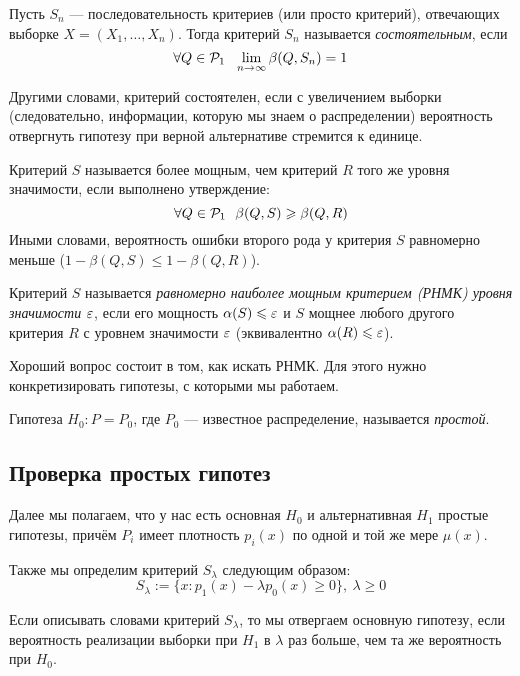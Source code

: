 \begin{definition}
	Пусть $S_n$ --- последовательность критериев (или просто критерий), отвечающих выборке $X = (X_1, \ldots, X_n)$. Тогда критерий $S_n$ называется \textit{состоятельным}, если
	\[
		\forall Q \in \mathcal{P}_1\ \ \lim_{n \to \infty} \beta(Q, S_n) = 1
	\]
\end{definition}

\begin{anote}
	Другими словами, критерий состоятелен, если с увеличением выборки (следовательно, информации, которую мы знаем о распределении) вероятность отвергнуть гипотезу при верной альтернативе стремится к единице.
\end{anote}

\begin{definition}
	Критерий $S$ называется более мощным, чем критерий $R$ того же уровня значимости, если выполнено утверждение:
	\[
		\forall Q \in \mathcal{P}_1\ \ \beta(Q, S) \geqslant \beta(Q, R)
	\]
	Иными словами, вероятность ошибки второго рода у критерия $S$ равномерно меньше ($1 - \beta(Q, S) \le 1 - \beta(Q, R)$).
\end{definition}

\begin{definition}
	Критерий $S$ называется \textit{равномерно наиболее мощным критерием (РНМК) уровня значимости $\varepsilon$}, если его мощность $\alpha(S) \leqslant \varepsilon$ и $S$ мощнее любого другого критерия $R$ с уровнем значимости $\varepsilon$ (эквивалентно $\alpha(R) \leqslant \varepsilon$).
\end{definition}

\begin{note}
	Хороший вопрос состоит в том, как искать РНМК. Для этого нужно конкретизировать гипотезы, с которыми мы работаем.
\end{note}

\begin{definition}
	Гипотеза $H_0 \colon P = P_0$, где $P_0$ --- известное распределение, называется \textit{простой}.
\end{definition}

\subsection{Проверка простых гипотез}

\begin{note}
	Далее мы полагаем, что у нас есть основная $H_0$ и альтернативная $H_1$ простые гипотезы, причём $P_i$ имеет плотность $p_i(x)$ по одной и той же мере $\mu(x)$.
	
	Также мы определим критерий $S_\lambda$ следующим образом:
	\[
		S_\lambda := \{x \colon p_1(x) - \lambda p_0(x) \ge 0\},\ \lambda \ge 0
	\]
\end{note}

\begin{anote}
	Если описывать словами критерий $S_\lambda$, то мы отвергаем основную гипотезу, если вероятность реализации выборки при $H_1$ в $\lambda$ раз больше, чем та же вероятность при $H_0$.
\end{anote}


